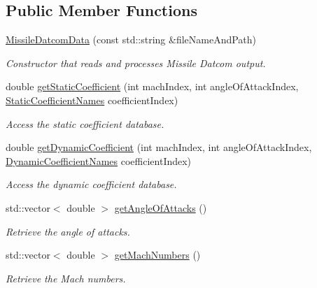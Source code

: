\subsection*{Public Member Functions}
\begin{DoxyCompactItemize}
\item 
\hyperlink{classtudat_1_1input__output_1_1MissileDatcomData_a7818405c9b4f8bdb3302948dcb64513b}{Missile\+Datcom\+Data} (const std\+::string \&file\+Name\+And\+Path)
\begin{DoxyCompactList}\small\item\em Constructor that reads and processes Missile Datcom output. \end{DoxyCompactList}\item 
double \hyperlink{classtudat_1_1input__output_1_1MissileDatcomData_ac415b9399cc895a2a010826b9432a753}{get\+Static\+Coefficient} (int mach\+Index, int angle\+Of\+Attack\+Index, \hyperlink{classtudat_1_1input__output_1_1MissileDatcomData_a59f58b6a3d2b3eaf142d8dae05aff805}{Static\+Coefficient\+Names} coefficient\+Index)
\begin{DoxyCompactList}\small\item\em Access the static coefficient database. \end{DoxyCompactList}\item 
double \hyperlink{classtudat_1_1input__output_1_1MissileDatcomData_a415898448aceb412dcb867b79f1eda19}{get\+Dynamic\+Coefficient} (int mach\+Index, int angle\+Of\+Attack\+Index, \hyperlink{classtudat_1_1input__output_1_1MissileDatcomData_a93b8790c7c2d450f94483c2f67dace70}{Dynamic\+Coefficient\+Names} coefficient\+Index)
\begin{DoxyCompactList}\small\item\em Access the dynamic coefficient database. \end{DoxyCompactList}\item 
std\+::vector$<$ double $>$ \hyperlink{classtudat_1_1input__output_1_1MissileDatcomData_a78afcae23a03f68ab848e9b4f6a67630}{get\+Angle\+Of\+Attacks} ()
\begin{DoxyCompactList}\small\item\em Retrieve the angle of attacks. \end{DoxyCompactList}\item 
std\+::vector$<$ double $>$ \hyperlink{classtudat_1_1input__output_1_1MissileDatcomData_af194cf80d0da6f96f5e6c587f206e8b1}{get\+Mach\+Numbers} ()
\begin{DoxyCompactList}\small\item\em Retrieve the Mach numbers. \end{DoxyCompactList}\item 

\end{DoxyCompactItemize}
